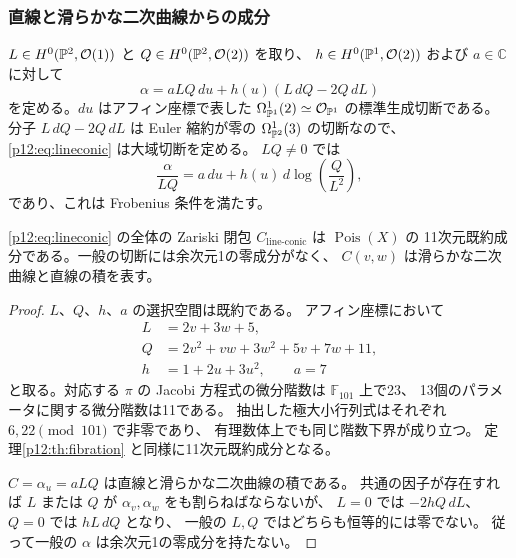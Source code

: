 \subsubsection{直線と滑らかな二次曲線からの成分}
$L\in H^0(\mathbb P^2,\mathcal O(1))$ と
$Q\in H^0(\mathbb P^2,\mathcal O(2))$ を取り、
$h\in H^0(\mathbb P^1,\mathcal O(2))$ および $a\in\mathbb C$ に対して
\begin{equation}\label{p12:eq:lineconic}
\alpha=aLQ\,du+h(u)(L\,dQ-2Q\,dL)
\end{equation}
を定める。$du$ はアフィン座標で表した
$\Omega^1_{\mathbb P^1}(2)\simeq\mathcal O_{\mathbb P^1}$ の標準生成切断である。
分子 $L\,dQ-2Q\,dL$ は Euler 縮約が零の
$\Omega^1_{\mathbb P^2}(3)$ の切断なので、
\eqref{p12:eq:lineconic} は大域切断を定める。
$LQ\ne0$ では
\[
\frac\alpha{LQ}=a\,du+h(u)\,d\log\!\left(\frac Q{L^2}\right),
\]
であり、これは Frobenius 条件を満たす。
\begin{theorem}\label{p12:th:lineconic}
\eqref{p12:eq:lineconic} の全体の Zariski 閉包
$C_{\mathrm{line\text{-}conic}}$ は $\operatorname{Pois}(X)$ の
11次元既約成分である。一般の切断には余次元1の零成分がなく、
$C(v,w)$ は滑らかな二次曲線と直線の積を表す。
\end{theorem}
\begin{proof}
$L$、$Q$、$h$、$a$ の選択空間は既約である。
アフィン座標において
\begin{align*}
 L&=2v+3w+5,\\
 Q&=2v^2+vw+3w^2+5v+7w+11,\\
 h&=1+2u+3u^2,\qquad a=7
\end{align*}
と取る。対応する $\pi$ の Jacobi 方程式の微分階数は
$\mathbb F_{101}$ 上で23、
13個のパラメータに関する微分階数は11である。
抽出した極大小行列式はそれぞれ $6,22\pmod{101}$ で非零であり、
有理数体上でも同じ階数下界が成り立つ。
定理\ref{p12:th:fibration} と同様に11次元既約成分となる。

$C=\alpha_u=aLQ$ は直線と滑らかな二次曲線の積である。
共通の因子が存在すれば $L$ または $Q$ が
$\alpha_v,\alpha_w$ をも割らねばならないが、
$L=0$ では $-2hQ\,dL$、$Q=0$ では $hL\,dQ$ となり、
一般の $L,Q$ ではどちらも恒等的には零でない。
従って一般の $\alpha$ は余次元1の零成分を持たない。
\end{proof}

